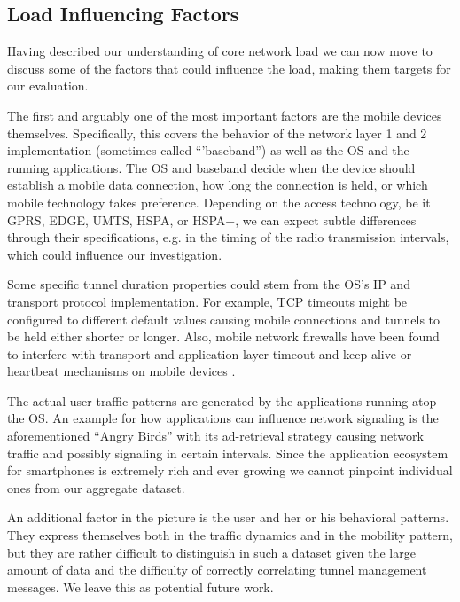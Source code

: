 \subsection{Load Influencing Factors}

Having described our understanding of core network load we can now move to discuss some of the factors that could influence the load, making them targets for our evaluation.

The first and arguably one of the most important factors are the mobile devices themselves. Specifically, this covers the behavior of the network layer 1 and 2 implementation (sometimes called ``'baseband'') as well as the \gls{OS} and the running applications. The OS and baseband decide when the device should establish a mobile data connection, how long the connection is held, or which mobile technology takes preference. Depending on the access technology, be it \acrshort{GPRS}, \acrshort{EDGE}, \acrshort{UMTS}, \acrshort{HSPA}, or \acrshort{HSPA+}, we can expect subtle differences through their specifications, e.g. in the timing of the radio transmission intervals, which could influence our investigation. 

Some specific tunnel duration properties could stem from the \gls{OS}'s IP and transport protocol implementation. For example, TCP timeouts might be configured to different default values causing mobile connections and tunnels to be held either shorter or longer. Also, mobile network firewalls have been found to interfere with transport and application layer timeout and keep-alive or heartbeat mechanisms on mobile devices \cite{sigcomm11middleboxes}.

The actual user-traffic patterns are generated by the applications running atop the OS. An example for how applications can influence network signaling is the aforementioned ``Angry Birds'' with its ad-retrieval strategy causing network traffic and possibly signaling in certain intervals. Since the application ecosystem for smartphones is extremely rich and ever growing we cannot pinpoint individual ones from our aggregate dataset.

An additional factor in the picture is the user and her or his behavioral patterns. They express themselves both in the traffic dynamics and in the mobility pattern, but they are rather difficult to distinguish in such a dataset given the large amount of data and the difficulty of correctly correlating tunnel management messages. We leave this as potential future work.

